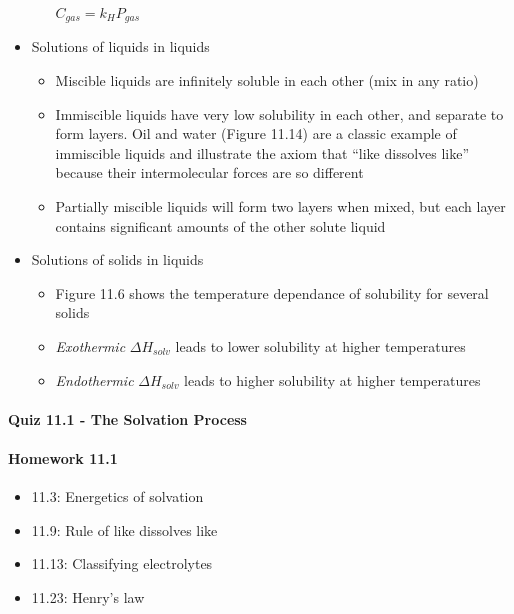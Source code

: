 \documentclass[12pt, openany, letterpaper]{memoir}
\begin{document}
\begin{itemize}
\begin{itemize}
      $C_{gas}=k_HP_{gas}$
  \end{itemize}
  \item Solutions of liquids in liquids
  \begin{itemize}
    \item Miscible liquids are infinitely soluble in each other (mix in any ratio)
    \item Immiscible liquids have very low solubility in each other, and separate to form layers. Oil and water (Figure 11.14) are a classic example of immiscible liquids and illustrate the axiom that ``like dissolves like'' because their intermolecular forces are so different
    \item Partially miscible liquids will form two layers when mixed, but each layer contains significant amounts of the other solute liquid
  \end{itemize}
  \item Solutions of solids in liquids
  \begin{itemize}
    \item Figure 11.6 shows the temperature dependance of solubility for several solids
    \item \emph{Exothermic} $\Delta H_{solv}$ leads to lower solubility at higher temperatures
    \item \emph{Endothermic} $\Delta H_{solv}$ leads to higher solubility at higher temperatures
  \end{itemize}
\end{itemize}
\paragraph*{Quiz 11.1 - The Solvation Process}
\paragraph*{Homework 11.1}
\begin{itemize}
  \item 11.3: Energetics of solvation
  \item 11.9: Rule of like dissolves like
  \item 11.13: Classifying electrolytes
  \item 11.23: Henry's law
\end{itemize}
\end{document}
